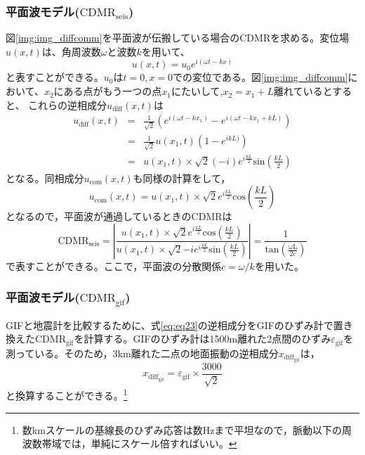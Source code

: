 \subsubsection{平面波モデル($\mathrm{CDMR_{seis}}$)}
図\ref{img:img_diffcomm}を平面波が伝搬している場合のCDMRを求める。変位場$u(x,t)$は、角周波数$\omega$と波数$k$を用いて、
\begin{equation}
  u(x,t) = u_{0}e^{i(\omega{t}-k{x})}
\end{equation}
と表すことができる。$u_{0}$は$t=0,x=0$での変位である。図\ref{img:img_diffcomm}において、$x_2$にある点がもう一つの点$x_1$にたいして,$x_2=x_1+L$離れているとすると、
これらの逆相成分$u_{\mathrm{diff}}(x,t)$は
\begin{eqnarray}
  u_{\mathrm{diff}}(x,t) &=& \frac{1}{\sqrt{2}}\left( e^{i(\omega{t}-k{x_1})} -e^{i(\omega{t}-k{x_1+kL})} \right)\\
  &=& \frac{1}{\sqrt{2}}u(x_1,t)\left( 1-e^{ikL)}  \right)\\
  &=& u(x_1,t)\times{\sqrt{2}{(-i)}}e^{i\frac{kL}{2}}\mathrm{sin}(\frac{kL}{2})
\end{eqnarray}
となる。同相成分$u_\mathrm{com}(x,t)$も同様の計算をして，
\begin{equation}
  u_{\mathrm{com}}(x,t) = u(x_1,t)\times{\sqrt{2}}e^{i\frac{kL}{2}}\mathrm{cos}(\frac{kL}{2})
\end{equation}
となるので，平面波が通過しているときの$\mathrm{CDMR}$は
\begin{equation}
  \boxed{\mathrm{CDMR_{seis}} = \left| \frac{u(x_1,t)\times{\sqrt{2}}e^{i\frac{kL}{2}}\mathrm{cos}(\frac{kL}{2})}{u(x_1,t)\times{\sqrt{2}{-i}}e^{i\frac{kL}{2}}\mathrm{sin}(\frac{kL}{2})}  \right| = \frac{1}{\mathrm{tan\left( \frac{\omega{L}}{2c}  \right)}}}
  \label{eq:eq18}
\end{equation}
で表すことができる。ここで，平面波の分散関係$c=\omega/k$を用いた。


\subsubsection{平面波モデル($\mathrm{CDMR_{gif}}$)}
GIFと地震計を比較するために、式\ref{eq:eq23}の逆相成分をGIFのひずみ計で置き換えた$\mathrm{CDMR_{gif}}$を計算する。GIFのひずみ計は1500m離れた2点間のひずみ$\varepsilon_{\mathrm{gif}}$を測っている。そのため，3km離れた二点の地面振動の逆相成分$x_{\mathrm{diff_{gif}}}$は，
\begin{equation}
  x_{\mathrm{diff_{gif}}} = \varepsilon_{\mathrm{gif}}\times \frac{3000}{\sqrt{2}}\label{eq:eq34} 
\end{equation}
と換算することができる。\footnote[5]{数kmスケールの基線長のひずみ応答は数Hzまで平坦なので，脈動以下の周波数帯域では，単純にスケール倍すればいい。}



